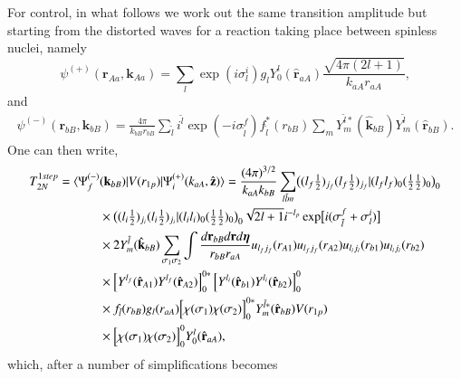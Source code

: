 For control, in what follows we work out the same transition amplitude but starting from the  distorted waves for a reaction taking place between spinless nuclei, namely
\begin{equation}\label{eq206}
    \psi^{(+)}(\mathbf{r}_{Aa},\mathbf{k}_{Aa})=\sum_{l}\exp\left(i\sigma_{l}^i\right)g_{l}Y_0^{l}
    (\hat{\mathbf{r}}_{aA})\frac{\sqrt{4\pi(2l+1)}}{k_{aA}r_{aA}},
\end{equation}
and
\begin{equation}\label{eq207}
\begin{split}
    \psi^{(-)}(\mathbf{r}_{bB},\mathbf{k}_{bB})
    =\frac{4\pi}{k_{bB}r_{bB}}\sum_{\tilde l}i^{\tilde l}
    \exp\left(-i\sigma_{\tilde l}^f\right)f_{\tilde l}^*(r_{bB})\sum_{m}Y_{m}^{\tilde l*}
    (\hat{\mathbf{k}}_{bB})Y_{m}^{\tilde l}(\hat{\mathbf{r}}_{bB}).
\end{split}
\end{equation}
One can then write,
\begin{equation}\label{eq208}
  \begin{split}
  T^{1step}_{2N}=\langle \Psi_f^{(-)}&(\mathbf{k}_{bB})|V(r_{1p})|\Psi_i^{(+)}(k_{aA},\hat {\mathbf{z}})\rangle=\frac{(4\pi)^{3/2}}{k_{aA}k_{bB}}\sum_{l \tilde l m}\bigl((l_f \tfrac{1}{2})_{j_f}(l_f \tfrac{1}{2})_{j_f}|(l_f l_f)_0(\tfrac{1}{2}\tfrac{1}{2})_0\bigr)_0\\
  &\times\bigl((l_i \tfrac{1}{2})_{j_i}(l_i \tfrac{1}{2})_{j_i}|(l_i l_i)_0(\tfrac{1}{2}\tfrac{1}{2})_0\bigr)_0\sqrt{2l+1}
 i^{-l_p}\exp\bigl[i(\sigma_{\tilde l}^f+\sigma_{l}^i)\bigr]\\
  &\times 2 Y_{m}^{\tilde l}(\hat{\mathbf{k}}_{bB})\sum_{\sigma_1\sigma_2} \int \frac {d\mathbf{r}_{bB}d\mathbf{r}d\boldsymbol{\eta}}{r_{bB} r_{aA}} u_{l_f j_f}(r_{A1})u_{l_f j_f}(r_{A2})u_{l_i j_i}(r_{b1})u_{l_i j_i}(r_{b2})\\
  &\times \left[Y^{l_f}(\hat{\mathbf{r}}_{A1})Y^{l_f}(\hat{\mathbf{r}}_{A2})\right]^{0*}_{0}
  \left[Y^{l_i}(\hat{\mathbf{r}}_{b1})Y^{l_i}(\hat{\mathbf{r}}_{b2})\right]^{0}_{0}\\
  &\times f_{\tilde l}(r_{bB})g_{l}(r_{aA})\Bigl[\chi(\sigma_1)\chi(\sigma_2)\Bigr]^{0*}_{0}Y_{m}^{\tilde l*}(\hat{\mathbf{r}}_{bB}) V(r_{1p}) \\
  &\times \Bigl[\chi(\sigma_1)\chi(\sigma_2)\Bigr]^{0}_{0}Y_0^{l}
    (\hat{\mathbf{r}}_{aA}),
  \end{split}
\end{equation}
which, after a number of simplifications becomes 
